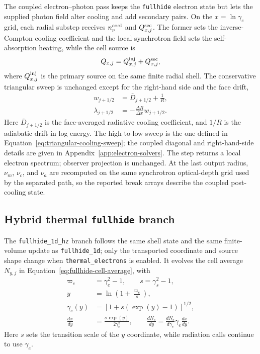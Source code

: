 \documentclass[twocolumn]{aastex702}
\begin{document}
The coupled electron--photon pass keeps the \texttt{fullhide} electron state but
lets the supplied photon field alter cooling and add secondary pairs.  On the
\(x=\ln\gamma_e\) grid, each radial substep receives \(n_\nu^{\rm cool}\) and
\(Q_{x,j}^{\rm sec}\).  The former sets the inverse-Compton cooling coefficient
and the local synchrotron field sets the self-absorption heating, while the cell
source is
\begin{equation}
Q_{x,j}=Q_{x,j}^{\rm inj}+Q_{x,j}^{\rm sec},
\end{equation}
where \(Q_{x,j}^{\rm inj}\) is the primary source on the same finite radial
shell.  The conservative triangular sweep is unchanged except for the
right-hand side and the face drift,
\begin{equation}
\begin{aligned}
w_{j+1/2}&=\bar D_{j+1/2}+\frac{1}{R},\\
\lambda_{j+1/2}&=-\frac{\Delta R}{\Delta x}w_{j+1/2}.
\end{aligned}
\end{equation}
Here \(\bar D_{j+1/2}\) is the face-averaged radiative cooling coefficient, and
\(1/R\) is the adiabatic drift in log energy.  The high-to-low sweep is the one
defined in Equation~\eqref{eq:triangular-cooling-sweep}; the coupled diagonal and
right-hand-side details are given in Appendix~\ref{app:electron-solvers}.  The
step returns a local electron spectrum; observer projection is unchanged.  At
the last output radius, \(\nu_m\), \(\nu_c\), and \(\nu_a\) are recomputed on
the same synchrotron optical-depth grid used by the separated path, so the
reported break arrays describe the coupled post-cooling state.

\subsection{Hybrid thermal \texttt{fullhide} branch}

The \texttt{fullhide\_1d\_hz} branch follows the same shell state and the same
finite-volume update as \texttt{fullhide\_1d}; only the transported coordinate
and source shape change when \texttt{thermal\_electrons} is enabled.  It evolves
the cell average \(N_{y,j}\) in Equation~\eqref{eq:fullhide-cell-average}, with
\begin{equation}
\begin{aligned}
\varpi_e&=\gamma_e^2-1,\qquad s=\gamma_s^2-1,\\
y&=\ln\!\left(1+\frac{\varpi_e}{s}\right),\\
\gamma_e(y)&=\left[1+s(\exp(y)-1)\right]^{1/2},\\
\frac{dx}{dy}&=\frac{s\,\exp(y)}{2\gamma_e^2},\qquad
\frac{dN_e}{dy}=\frac{dN_e}{d\gamma_e}\gamma_e\frac{dx}{dy}.
\end{aligned}
\end{equation}
Here \(s\) sets the transition scale of the \(y\) coordinate, while radiation
calls continue to use \(\gamma_e\).
\end{document}
